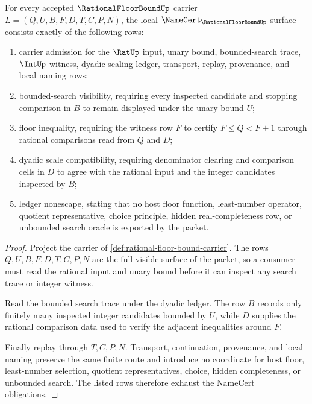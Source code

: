 \begin{theorem}
\label{thm:rational-floor-bound-namecert-obligations}
For every accepted $\RationalFloorBoundUp$ carrier $L=(Q,U,B,F,D,T,C,P,N)$, the local $\NameCert_{\RationalFloorBoundUp}$ surface consists exactly of the following rows:
\begin{enumerate}
\item carrier admission for the $\RatUp$ input, unary bound, bounded-search trace, $\IntUp$ witness, dyadic scaling ledger, transport, replay, provenance, and local naming rows;
\item bounded-search visibility, requiring every inspected candidate and stopping comparison in $B$ to remain displayed under the unary bound $U$;
\item floor inequality, requiring the witness row $F$ to certify $F \leq Q < F+1$ through rational comparisons read from $Q$ and $D$;
\item dyadic scale compatibility, requiring denominator clearing and comparison cells in $D$ to agree with the rational input and the integer candidates inspected by $B$;
\item ledger nonescape, stating that no host floor function, least-number operator, quotient representative, choice principle, hidden real-completeness row, or unbounded search oracle is exported by the packet.
\end{enumerate}
\end{theorem}
\begin{proof}
Project the carrier of \autoref{def:rational-floor-bound-carrier}. The rows $Q,U,B,F,D,T,C,P,N$ are the full visible surface of the packet, so a consumer must read the rational input and unary bound before it can inspect any search trace or integer witness.

Read the bounded search trace under the dyadic ledger. The row $B$ records only finitely many inspected integer candidates bounded by $U$, while $D$ supplies the rational comparison data used to verify the adjacent inequalities around $F$.

Finally replay through $T,C,P,N$. Transport, continuation, provenance, and local naming preserve the same finite route and introduce no coordinate for host floor, least-number selection, quotient representatives, choice, hidden completeness, or unbounded search. The listed rows therefore exhaust the NameCert obligations.
\end{proof}

